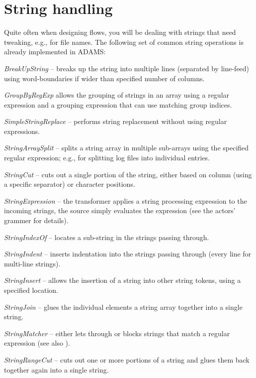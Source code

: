 \section{String handling}
\label{string_handling}
Quite often when designing flows, you will be dealing with strings that need
tweaking, e.g., for file names. The following set of common string operations is
already implemented in ADAMS:
\begin{tight_itemize}
	\item \textit{BreakUpString} -- breaks up the string into multiple lines 
	(separated by line-feed) using word-boundaries if wider than specified 
	number of columns.
	\item \textit{GroupByRegExp} allows the grouping of strings in an array
	using a regular expression and a grouping expression that can use
	matching group indices.
	\item \textit{SimpleStringReplace} -- performs string replacement
	without using regular expressions.
	\item \textit{StringArraySplit} -- splits a string array in multiple
	sub-arrays using the specified regular expression; e.g., for splitting
	log files into individual entries.
	\item \textit{StringCut} -- cuts out a single portion of the string, either
	based on column (using a specific separator) or character positions.
	\item \textit{StringExpression} -- the transformer applies a string processing
	expression to the incoming strings, the source simply evaluates the expression
	(see the actors' grammer for details).
	\item \textit{StringIndexOf} -- locates a sub-string in the strings passing
	through.
	\item \textit{StringIndent} -- inserts indentation into the strings
	passing through (every line for multi-line strings).
	\item \textit{StringInsert} -- allows the insertion of a string into other
	string tokens, using a specified location.
	\item \textit{StringJoin} -- glues the individual elements a string array
	together into a single string.
	\item \textit{StringMatcher} -- either lets through or blocks strings that
	match a regular expression (see also \cite{regexp}).
	\item \textit{StringRangeCut} -- cuts out one or more portions of a string and
	glues them back together again into a single string.

\end{tight_itemize}
